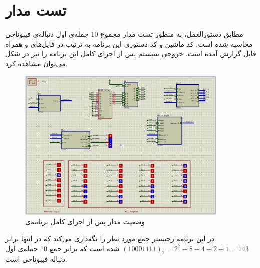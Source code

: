 \documentclass[12pt,onecolumn,a4paper,fleqn]{article}
\begin{document}
	\section{تست مدار}
	مطابق دستورالعمل، به منظور تست مدار مجموع 10 جمله‌ی اول دنباله‌ی فیبوناچی محاسبه شده است. کد ماشین و کد دستوری این برنامه به ترتیب در فایل‌های
	و
	همراه فایل گزارش آمده است. خروجی سیستم پس از اجرای کامل این برنامه را نیز در شکل
	می‌توان مشاهده کرد.
	\begin{figure}[H]
		\centering
		\includegraphics[width=0.9\textwidth]{source/fibo_final.png}
		\caption{وضعیت مدار پس از اجرای کامل برنامه‌ی }
		\label{fig:fibo}
	\end{figure}
\noindent
	در این برنامه رجیستر
	جمع مورد نظر را نگه‌داری می‌کند که در انتها برابر
	$(10001111)_2 = 2^7 + 8 + 4 + 2 + 1 = 143$
	شده است که برابر جمع 10 جمله‌ی اول دنباله فیبوناچی است.
	
\end{document}
